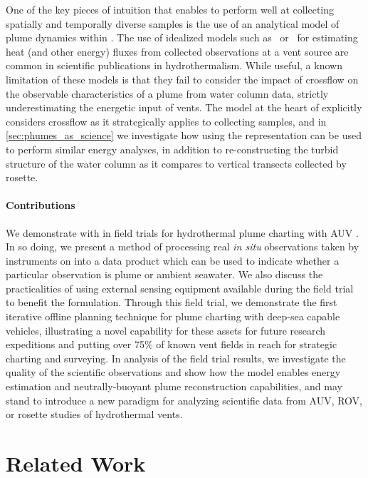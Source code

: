 One of the key pieces of intuition that enables \PHORTEX to perform well at collecting spatially and temporally diverse samples is the use of an analytical model of plume dynamics within \PHUMES. The use of idealized models such as~\cite{morton1956turbulent} or~\cite{speer1989model} for estimating heat (and other energy) fluxes from collected observations at a vent source are common in scientific publications in hydrothermalism\autocite{barreyre2012structure,wilson1996hydrothermal,mittelstaedt2012quantifying,baker1993method,ramondenc2006first}. While useful, a known limitation of these models is that they fail to consider the impact of crossflow on the observable characteristics of a plume from water column data, strictly underestimating the energetic input of vents. The model at the heart of \PHUMES explicitly considers crossflow as it strategically applies to collecting samples, and in \cref{sec:phumes_as_science} we investigate how using the \PHUMES representation can be used to perform similar energy analyses, in addition to re-constructing the turbid structure of the water column as it compares to vertical transects collected by rosette.

\paragraph{Contributions}
We demonstrate \PHORTEX with \PHUMES in field trials for hydrothermal plume charting with AUV \Sentry. In so doing, we present a method of processing real \emph{in situ} observations taken by instruments on \Sentry into a data product which can be used to indicate whether a particular observation is plume or ambient seawater. We also discuss the practicalities of using external sensing equipment available during the field trial to benefit the \PHUMES formulation. Through this field trial, we demonstrate the first iterative offline planning technique for plume charting with deep-sea capable vehicles, illustrating a novel capability for these assets for future research expeditions and putting over 75\% of known vent fields\autocite{beaulieu2013authoritative} in reach for strategic charting and surveying. In analysis of the field trial results, we investigate the quality of the scientific observations and show how the \PHUMES model enables energy estimation and neutrally-buoyant plume reconstruction capabilities, and may stand to introduce a new paradigm for analyzing scientific data from AUV, ROV, or rosette studies of hydrothermal vents.  


\section{Related Work}
\label{sec:field_rw}
